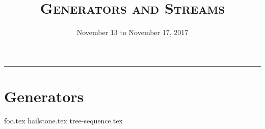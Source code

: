 \documentclass{exam}
\title{\textsc{Generators and Streams}}
\date{November 13 to November 17, 2017}
\begin{document}
\maketitle
\rule{\textwidth}{0.15em}
\fontsize{12}{15}\selectfont



\section{Generators}
\begin{questions}
    {foo.tex}
    \newpage
    {hailstone.tex}
    {tree-sequence.tex}
\end{questions}


\newpage
\end{document}
